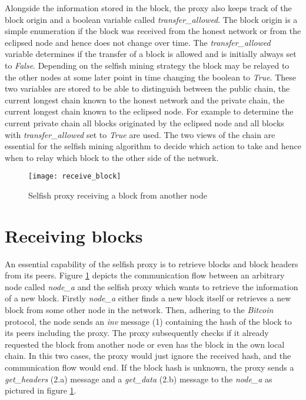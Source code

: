 Alongside the information stored in the block, the proxy also keeps track of the block origin and a boolean variable called \textit{transfer\_allowed}. 
The block origin is a simple enumeration if the block was received from the honest network or from the eclipsed node and hence does not change over time.
The \textit{transfer\_allowed} variable determines if the transfer of a block is allowed and is initially always set to \textit{False}.
Depending on the selfish mining strategy the block may be relayed to the other nodes at some later point in time changing the boolean to \textit{True}.
These two variables are stored to be able to distinguish between the public chain, the current longest chain known to the honest network and the private chain, the current longest chain known to  the eclipsed node.
For example to determine the current private chain all blocks originated by the eclipsed node and all blocks with \textit{transfer\_allowed} set to \textit{True} are used.
The two views of the chain are essential for the selfish mining algorithm to decide which action to take and hence when to relay which block to the other side of the network.

\begin{figure}
	\centering
    \texttt{[image: receive\_block]}
    \caption{Selfish proxy receiving a block from another node}
    \label{fig:receive_block}
\end{figure}

\section{Receiving blocks}

An essential capability of the selfish proxy is to retrieve blocks and block headers from its peers.
Figure \ref{fig:receive_block} depicts the communication flow between an arbitrary node called \textit{node\_a} and the selfish proxy which wants to retrieve the information of a new block.
Firstly \textit{node\_a} either finds a new block itself or retrieves a new block from some other node in the network.
Then, adhering to the \textit{Bitcoin} protocol, the node sends an \textit{inv} message (1) containing the hash of the block to its peers including the proxy.
The proxy subsequently checks if it already requested the block from another node or even has the block in the own local chain.
In this two cases, the proxy would just ignore the received hash, and the communication flow would end.
If the block hash is unknown, the proxy sends a \textit{get\_headers} (2.a) message and a \textit{get\_data} (2.b) message to the \textit{node\_a} as pictured in figure \ref{fig:receive_block}.

